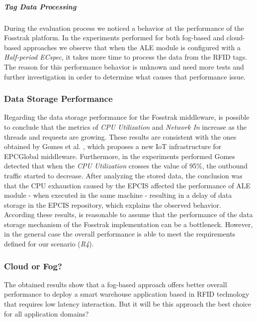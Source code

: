 \subparagraph{Tag Data Processing}
\label{subp:eval_tag_processing}
During the evaluation process we noticed a behavior at the performance of the Fosstrak platform.
In the experiments performed for both fog-based and cloud-based approaches we observe that when
the \gls{ALE} module is configured with a \textit{Half-period ECspec}, it takes more time to
process the data from the \gls{RFID} tags. The reason for this performance behavior is unknown and
need more tests and further investigation in order to determine what causes that performance issue.

\subsubsection{Data Storage Performance}
\label{subs:eval_results_data}
Regarding the data storage performance for the Fosstrak middleware, is possible to conclude that the metrics
of \textit{CPU Utilization} and \textit{Network In} increase as the threads and requests are growing.
These results are consistent with the ones obtained by Gomes et al. \cite{gomes2014future}, which
proposes a new \gls{IoT} infrastructure for \gls{EPC}Global middleware. Furthermore, in the experiments
performed Gomes detected that when the \textit{CPU Utilization} crosses the value of 95$\%$, the
outbound traffic started to decrease. After analyzing the stored data, the conclusion was that the
\gls{CPU} exhaustion caused by the \gls{EPCIS} affected the performance of \gls{ALE} module - when
executed in the same machine - resulting in a delay of data storage in the \gls{EPCIS} repository,
which explains the observed behavior.\\

According these results, is reasonable to assume that the performance of the data storage mechanism of
the Fosstrak implementation can be a bottleneck. However, in the general case the overall performance
is able to meet the requirements defined for our scenario (\textit{R4}).

\subsubsection{Cloud or Fog?}
\label{subs:eval_conclusion}
The obtained results show that a fog-based approach offers better overall performance to deploy a
smart warehouse application based in \gls{RFID} technology that requires low latency interaction.
But it will be this approach the best choice for all application domains?\\

